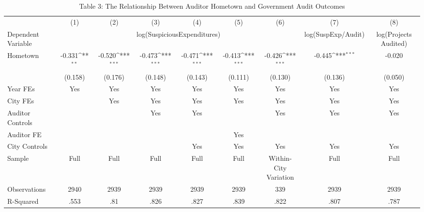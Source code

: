 \begin{table}[p]\centering\captionsetup{width=\textwidth,labelformat=empty}\begin{threeparttable}\footnotesize{
\def\sym#1{\ifmmode^{#1}\else\(^{#1}\)\fi}
\caption{Table 3: The Relationship Between Auditor Hometown and Government Audit Outcomes}
\begin{tabular}{l*{8}{c}}
\hline\hline
                    &\multicolumn{1}{c}{(1)}         &\multicolumn{1}{c}{(2)}         &\multicolumn{1}{c}{(3)}         &\multicolumn{1}{c}{(4)}         &\multicolumn{1}{c}{(5)}         &\multicolumn{1}{c}{(6)}         &\multicolumn{1}{c}{(7)}         &\multicolumn{1}{c}{(8)}         \\
Dependent Variable & \multicolumn{6}{c}{log(SuspiciousExpenditures)} & log(SuspExp/Audit) & log(Projects Audited) \\
\hline
Hometown            &      -0.331\sym{**} &      -0.520\sym{***}&      -0.473\sym{***}&      -0.471\sym{***}&      -0.413\sym{***}&      -0.426\sym{***}&      -0.445\sym{***}&      -0.020         \\
                    &     (0.158)         &     (0.176)         &     (0.148)         &     (0.143)         &     (0.111)         &     (0.130)         &     (0.136)         &     (0.050)         \\
\hline
Year FEs         & Yes & Yes & Yes & Yes & Yes & Yes & Yes & Yes \\
City FEs         &     & Yes & Yes & Yes & Yes & Yes & Yes & Yes \\
Auditor Controls &     &     & Yes & Yes &     & Yes & Yes & Yes \\
Auditor FE       &     &     &     &     &     Yes     &     &         &         \\
City Controls    &     &     &     & Yes & Yes & Yes & Yes & Yes \\
\hline
Sample & Full & Full & Full & Full & Full & \tabincell{c}{Within-City \\ Variation} & Full & Full \\ 
\hline
Observations        &        2940         &        2939         &        2939         &        2939         &        2939         &         339         &        2939         &        2939         \\
R-Squared           &        .553         &         .81         &        .826         &        .827         &        .839         &        .822         &        .807         &        .787         \\

\end{tabular}}
\end{threeparttable}
\end{table}
